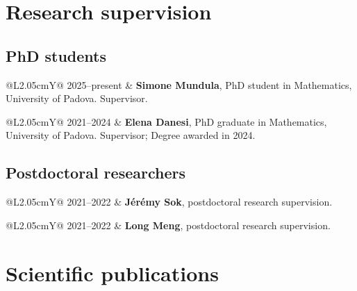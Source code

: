 \documentclass[10pt,a4paper]{article}
\makeatletter
\newcommand{\yearrow}[2]{%
  \begin{tabularx}{\textwidth}{@{}L{2.05cm}Y@{}}
    \textcolor{muted}{#1} & #2
  \end{tabularx}\vspace{1pt}
}
\makeatother
\begin{document}
\newpage
\section{Research supervision}

\subsection{PhD students}
\yearrow{2025--present}{\textbf{Simone Mundula}, PhD student in Mathematics, University of Padova. Supervisor.}
\yearrow{2021--2024}{\textbf{Elena Danesi}, PhD graduate in Mathematics, University of Padova. Supervisor; Degree awarded in 2024.}

\subsection{Postdoctoral researchers}
\yearrow{2021--2022}{\textbf{J\'er\'emy Sok}, postdoctoral research supervision.}
\yearrow{2021--2022}{\textbf{Long Meng}, postdoctoral research supervision.}

\section{Scientific publications}

\end{document}
